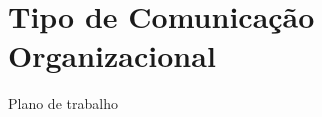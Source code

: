 \section{Tipo de Comunicação Organizacional} \label{section: Tipo de Comunicação Organizacional}
Plano de trabalho